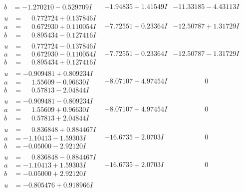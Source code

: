 \documentclass[1p]{elsarticle_modified}
\theoremstyle{definition}
\begin{document}
$$\begin{array}{c|c|c}
\begin{aligned}
b &= -1.270210 - 0.529709 I\end{aligned}
 & -1.94835 + 1.41549 I & -11.33185 - 4.43113 I \\ \hline\begin{aligned}
u &= \phantom{-}0.772724 + 0.137846 I \\
a &= \phantom{-}0.672930 + 0.110054 I \\
b &= \phantom{-}0.895434 - 0.127416 I\end{aligned}
 & -7.72551 + 0.23364 I & -12.50787 + 1.31729 I \\ \hline\begin{aligned}
u &= \phantom{-}0.772724 - 0.137846 I \\
a &= \phantom{-}0.672930 - 0.110054 I \\
b &= \phantom{-}0.895434 + 0.127416 I\end{aligned}
 & -7.72551 - 0.23364 I & -12.50787 - 1.31729 I \\ \hline\begin{aligned}
u &= -0.909481 + 0.809234 I \\
a &= \phantom{-}1.55609 - 0.96630 I \\
b &= \phantom{-}0.57813 - 2.04844 I\end{aligned}
 & -8.07107 - 4.97454 I & \phantom{-0.000000 } 0 \\ \hline\begin{aligned}
u &= -0.909481 - 0.809234 I \\
a &= \phantom{-}1.55609 + 0.96630 I \\
b &= \phantom{-}0.57813 + 2.04844 I\end{aligned}
 & -8.07107 + 4.97454 I & \phantom{-0.000000 } 0 \\ \hline\begin{aligned}
u &= \phantom{-}0.836848 + 0.884467 I \\
a &= -1.10413 - 1.59303 I \\
b &= -0.05000 - 2.92120 I\end{aligned}
 & -16.6735 - 2.0703 I & \phantom{-0.000000 } 0 \\ \hline\begin{aligned}
u &= \phantom{-}0.836848 - 0.884467 I \\
a &= -1.10413 + 1.59303 I \\
b &= -0.05000 + 2.92120 I\end{aligned}
 & -16.6735 + 2.0703 I & \phantom{-0.000000 } 0 \\ \hline\begin{aligned}
u &= -0.805476 + 0.918966 I \\

\end{aligned}
\end{array}$$
\end{document}
